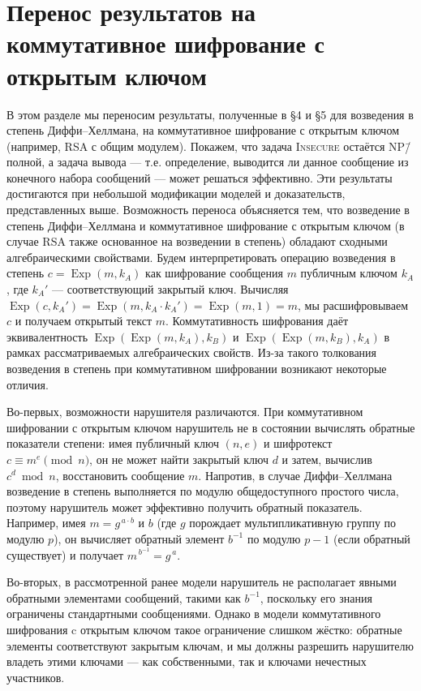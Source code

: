 \section{Перенос результатов на коммутативное
           шифрование с открытым ключом}

В этом разделе мы переносим результаты, полученные в §4 и §5 для
возведения в степень Диффи–Хеллмана, на коммутативное
шифрование с открытым ключом (например, RSA с общим модулем).
Покажем, что задача \textsc{Insecure} остаётся NP\=/полной, а задача
вывода — т.е. определение, выводится ли данное сообщение из конечного
набора сообщений — может решаться эффективно. Эти результаты
достигаются при небольшой модификации моделей и доказательств,
представленных выше. Возможность переноса объясняется тем, что
возведение в степень Диффи–Хеллмана и коммутативное шифрование
с открытым ключом (в случае RSA также основанное на возведении в
степень) обладают сходными алгебраическими свойствами.
Будем интерпретировать операцию возведения в степень
$c=\operatorname{Exp}(m,k_{A})$ как шифрование сообщения $m$
публичным ключом $k_{A}$, где $k_{A}'$ — соответствующий
закрытый ключ. Вычисляя
\(\operatorname{Exp}(c,k_{A}')=
  \operatorname{Exp}(m,k_{A}\cdot k_{A}')=
  \operatorname{Exp}(m,1)=m\),
мы расшифровываем $c$ и получаем открытый текст $m$.
Коммутативность шифрования даёт эквивалентность
\(\operatorname{Exp}(\operatorname{Exp}(m,k_{A}),k_{B})\) и
\(\operatorname{Exp}(\operatorname{Exp}(m,k_{B}),k_{A})\)
в рамках рассматриваемых алгебраических свойств.
Из-за такого толкования возведения в степень при
коммутативном шифровании возникают некоторые отличия.

Во-первых, возможности нарушителя различаются.  
При коммутативном шифровании с открытым ключом нарушитель не в
состоянии вычислять обратные показатели степени: имея публичный ключ
\((n,e)\) и шифротекст \(c \equiv m^{e}\pmod n\), он не может найти закрытый
ключ \(d\) и затем, вычислив \(c^{d}\bmod n\), восстановить сообщение \(m\).
Напротив, в случае Диффи–Хеллмана возведение в степень выполняется по
модулю общедоступного простого числа, поэтому нарушитель может
эффективно получить обратный показатель. Например, имея
\(m=g^{\,a\cdot b}\) и \(b\) (где \(g\) порождает мультипликативную группу по
модулю \(p\)), он вычисляет обратный элемент \(b^{-1}\) по модулю \(p-1\)
(если обратный существует) и получает \(m^{\,b^{-1}}=g^{\,a}\).

Во-вторых, в рассмотренной ранее модели нарушитель не располагает
явными обратными элементами сообщений, такими как \(b^{-1}\), поскольку
его знания ограничены стандартными сообщениями.  Однако в модели
коммутативного шифрования c открытым ключом такое ограничение слишком
жёстко: обратные элементы соответствуют закрытым ключам, и мы должны
разрешить нарушителю владеть этими ключами — как собственными,
так и ключами нечестных участников.

